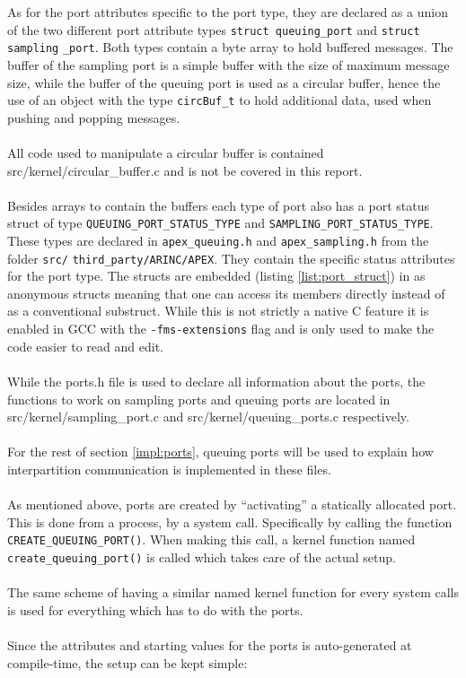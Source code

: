 As for the port attributes specific to the port type,
they are declared as a union of the two different port attribute types
\texttt{struct queuing\_port} and
\texttt{struct} \texttt{sampling} \texttt{\_port}.
Both types contain a byte array to hold buffered messages.
The buffer of the sampling port is a simple buffer with the size of maximum message size,
while the buffer of the queuing port is used as a circular buffer,
hence the use of an object with the type \texttt{circBuf\_t} to hold additional data,
used when pushing and popping messages.
\\\\
All code used to manipulate a circular buffer is contained src/kernel/circular\_buffer.c
and is not be covered in this report.
\\\\
Besides arrays to contain the buffers each type of port also has a port status struct
of type \texttt{QUEUING\_PORT\_STATUS\_TYPE} and \texttt{SAMPLING\_PORT\_STATUS\_TYPE}.
These types are declared in \texttt{apex\_queuing.h} and \texttt{apex\_sampling.h}
from the folder \texttt{src/} \texttt{third\_party/ARINC/APEX}.
They contain the specific status attributes for the port type.
The structs are embedded (listing \ref{list:port_struct}) in as anonymous structs
meaning that one can access its members directly instead of as a conventional substruct.
While this is not strictly a native C feature it is enabled in GCC with the \texttt{-fms-extensions} flag
and is only used to make the code easier to read and edit.
\\\\
While the ports.h file is used to declare all information about the ports,
the functions to work on sampling ports and queuing ports are located in
src/kernel/sampling\_port.c and src/kernel/queuing\_ports.c respectively.
\\\\
For the rest of section \ref{impl:ports}, queuing ports will be used to explain
how interpartition communication is implemented in these files.
\\\\
As mentioned above,
ports are created by ``activating'' a statically allocated port.
This is done from a process, by a system call.
Specifically by calling the function \texttt{CREATE\_QUEUING\_PORT()}.
When making this call, a kernel function named \texttt{create\_queuing\_port()}
is called which takes care of the actual setup.
\\\\
The same scheme of having a similar named kernel function for every system calls
is used for everything which has to do with the ports.
\\\\
Since the attributes and starting values for the ports is auto-generated at compile-time,
the setup can be kept simple:

